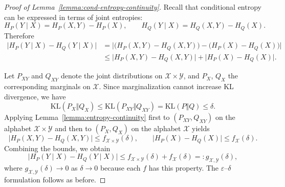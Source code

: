 \documentclass{article}
\begin{document}
\begin{proof}[Proof of Lemma~\ref{lemma:cond-entropy-continuity}]
Recall that conditional entropy can be expressed in terms of joint
entropies:
\[
H_P(Y \mid X) = H_P(X,Y) - H_P(X), \qquad
H_Q(Y \mid X) = H_Q(X,Y) - H_Q(X).
\]
Therefore
\begin{align*}
\bigl| H_P(Y \mid X) - H_Q(Y \mid X) \bigr|
&= \bigl| \bigl(H_P(X,Y) - H_Q(X,Y)\bigr)
- \bigl(H_P(X) - H_Q(X)\bigr) \bigr| \\
&\le \bigl|H_P(X,Y) - H_Q(X,Y)\bigr|
+ \bigl|H_P(X) - H_Q(X)\bigr|.
\end{align*}

Let $P_{XY}$ and $Q_{XY}$ denote the joint distributions on
$\mathcal{X}\times\mathcal{Y}$, and $P_X$, $Q_X$ the corresponding
marginals on $\mathcal{X}$. Since marginalization cannot increase
KL divergence, we have
\[
\mathrm{KL}(P_X \Vert Q_X)
\le \mathrm{KL}(P_{XY} \Vert Q_{XY})
= \mathrm{KL}(P\Vert Q) \le \delta.
\]
Applying Lemma~\ref{lemma:entropy-continuity} first to
$(P_{XY},Q_{XY})$ on the alphabet $\mathcal{X}\times\mathcal{Y}$ and
then to $(P_X,Q_X)$ on the alphabet $\mathcal{X}$ yields
\[
\bigl|H_P(X,Y) - H_Q(X,Y)\bigr|
\le f_{\mathcal{X}\times\mathcal{Y}}(\delta), \qquad
\bigl|H_P(X) - H_Q(X)\bigr|
\le f_{\mathcal{X}}(\delta).
\]
Combining the bounds, we obtain
\[
\bigl| H_P(Y \mid X) - H_Q(Y \mid X) \bigr|
\le f_{\mathcal{X}\times\mathcal{Y}}(\delta)
+ f_{\mathcal{X}}(\delta)
=: g_{\mathcal{X},\mathcal{Y}}(\delta),
\]
where $g_{\mathcal{X},\mathcal{Y}}(\delta)\to 0$ as $\delta\to 0$
because each $f$ has this property.
The $\varepsilon$--$\delta$ formulation follows as before.
\end{proof}
\end{document}
